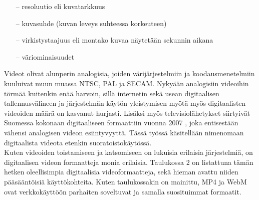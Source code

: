 \documentclass[finnish, 12pt, a4paper, elec, utf8, a-1b, online]{aaltothesis}
\begin{document}
\begin{itemize}
  \item[--] resoluutio eli kuvatarkkuus
  \item[--] kuvasuhde (kuvan leveys suhteessa korkeuteen)
  \item[--] virkistystaajuus eli montako kuvaa näytetään sekunnin aikana
  \item[--] väriominaisuudet
\end{itemize}

\noindent Videot olivat alunperin analogisia, joiden värijärjestelmiin ja koodausmenetelmiin kuuluivat muun muassa NTSC, PAL ja SECAM. Nykyään analogisiin videoihin törmää kuitenkin enää harvoin, sillä internetin sekä usean digitaalisen tallennusvälineen ja järjestelmän käytön yleistymisen myötä myös digitaalisten videoiden määrä on kasvanut hurjasti. Lisäksi myös televisiolähetykset siirtyivät Suomessa kokonaan digitaaliseen formaattiin vuonna 2007 \cite{Digita}, joka entisestään vähensi analogisen videon esiintyvyyttä. Tässä työssä käsitellään nimenomaan digitaalista videota etenkin suoratoistokäytössä. \\

\noindent Kuten videoiden toistamiseen ja katsomiseen on lukuisia erilaisia järjestelmiä, on digitaalisen videon formaatteja monia erilaisia. Taulukossa 2 on listattuna tämän hetken oleellisimpia digitaalisia videoformaatteja, sekä hieman avattu niiden pääsääntöisiä käyttökohteita. Kuten taulukossakin on mainittu, MP4 ja WebM ovat verkkokäyttöön parhaiten soveltuvat ja samalla suosituimmat formaatit.
\end{document}
